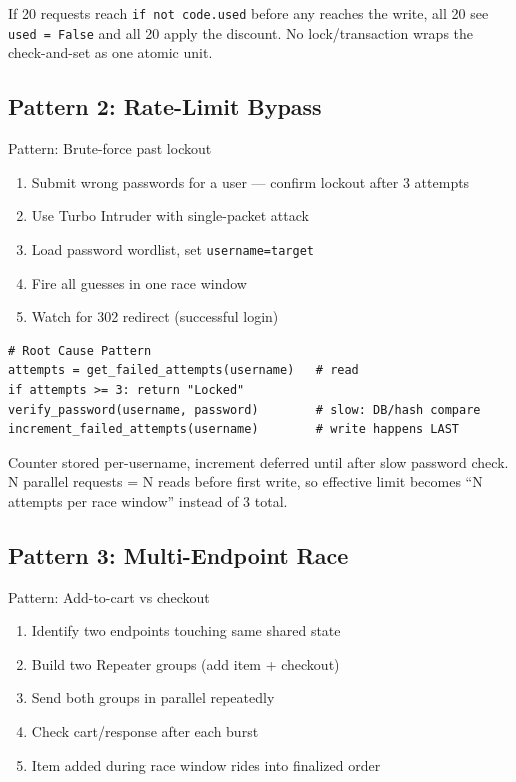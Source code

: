 \documentclass[11pt]{article}
\begin{document}
\begin{causebox}
If 20 requests reach \texttt{if not code.used} before any reaches the write, all 20 see \texttt{used = False} and all 20 apply the discount. No lock/transaction wraps the check-and-set as one atomic unit.
\end{causebox}

\subsection{Pattern 2: Rate-Limit Bypass}

\begin{labbox}{Pattern: Brute-force past lockout}
\begin{enumerate}
    \item Submit wrong passwords for a user — confirm lockout after 3 attempts
    \item Use Turbo Intruder with single-packet attack
    \item Load password wordlist, set \texttt{username=target}
    \item Fire all guesses in one race window
    \item Watch for 302 redirect (successful login)
\end{enumerate}
\end{labbox}

\begin{lstlisting}[style=code]
# Root Cause Pattern
attempts = get_failed_attempts(username)   # read
if attempts >= 3: return "Locked"
verify_password(username, password)        # slow: DB/hash compare
increment_failed_attempts(username)        # write happens LAST
\end{lstlisting}

\begin{causebox}
Counter stored per-username, increment deferred until after slow password check. N parallel requests = N reads before first write, so effective limit becomes ``N attempts per race window'' instead of 3 total.
\end{causebox}

\subsection{Pattern 3: Multi-Endpoint Race}

\begin{labbox}{Pattern: Add-to-cart vs checkout}
\begin{enumerate}
    \item Identify two endpoints touching same shared state
    \item Build two Repeater groups (add item + checkout)
    \item Send both groups in parallel repeatedly
    \item Check cart/response after each burst
    \item Item added during race window rides into finalized order
\end{enumerate}
\end{labbox}
\end{document}
